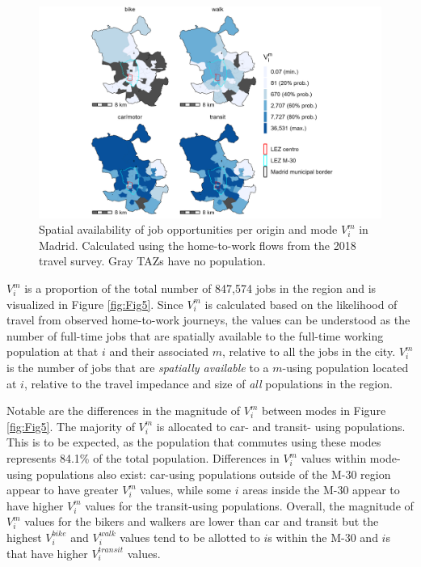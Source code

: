 \documentclass[10pt,letterpaper]{article}
\begin{document}
\begin{figure}

{\centering \includegraphics[width=1\linewidth]{images/SA_im_V_zn208_plot} 

}

\caption{\label{fig:Fig5} Spatial availability of job opportunities per origin and mode $V_i^m$ in Madrid. Calculated using the home-to-work flows from the 2018 travel survey. Gray TAZs have no population.}\label{fig:SA-m-plot}
\end{figure}

\(V_i^m\) is a proportion of the total number of 847,574 jobs in the
region and is visualized in Figure \ref{fig:Fig5}. Since \(V_i^m\) is
calculated based on the likelihood of travel from observed home-to-work
journeys, the values can be understood as the number of full-time jobs
that are spatially available to the full-time working population at that
\(i\) and their associated \(m\), relative to all the jobs in the city.
\(V_i^m\) is the number of jobs that are \emph{spatially available} to a
\(m\)-using population located at \(i\), relative to the travel
impedance and size of \emph{all} populations in the region.

Notable are the differences in the magnitude of \(V_i^m\) between modes
in Figure \ref{fig:Fig5}. The majority of \(V_i^m\) is allocated to car-
and transit- using populations. This is to be expected, as the
population that commutes using these modes represents 84.1\% of the
total population. Differences in \(V_i^m\) values within mode-using
populations also exist: car-using populations outside of the M-30 region
appear to have greater \(V_i^m\) values, while some \(i\) areas inside
the M-30 appear to have higher \(V_i^m\) values for the transit-using
populations. Overall, the magnitude of \(V_i^m\) values for the bikers
and walkers are lower than car and transit but the highest
\(V_i^{bike}\) and \(V_i^{walk}\) values tend to be allotted to \(i\)s
within the M-30 and \(i\)s that have higher \(V_i^{transit}\) values.
\end{document}
